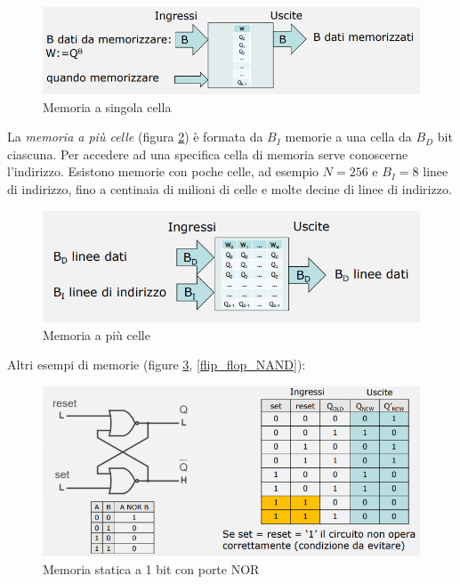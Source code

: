\documentclass{article}
\begin{document}
\begin{figure}[h]
  \centering
  \includegraphics[scale=0.7]{IM_memoria_1_cella}
  \caption{Memoria a singola cella}
  \label{memoria_1_cella}
\end{figure}

La \textit{memoria a più celle} (figura \ref{memoria_piu_celle}) è formata da $B_I$ memorie a una cella da $B_D$ bit ciascuna. Per accedere ad una specifica cella di memoria serve conoscerne l'indirizzo. Esistono memorie con poche celle, ad esempio $N = 256$ e $B_I = 8$ linee di indirizzo, fino a centinaia di milioni di celle e molte decine di linee di indirizzo.

\begin{figure}[h]
  \centering
  \includegraphics[scale=0.7]{IM_memoria_piu_celle}
  \caption{Memoria a più celle}
  \label{memoria_piu_celle}
\end{figure}
Altri esempi di memorie (figure \ref{flip_flop_NOR}, \ref{flip_flop_NAND}):
\begin{figure}[h]
  \centering
  \includegraphics[scale=0.5]{IM_flip_flop_NOR}
  \caption{Memoria statica a 1 bit con porte NOR}
  \label{flip_flop_NOR}
\end{figure}
\end{document}
